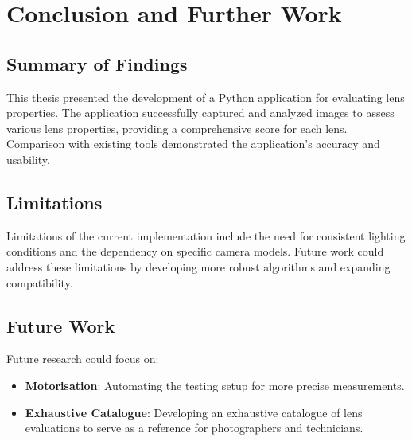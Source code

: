 \chapter{Conclusion and Further Work}
\section{Summary of Findings}
This thesis presented the development of a Python application for evaluating lens properties. The application successfully captured and analyzed images to assess various lens properties, providing a comprehensive score for each lens. Comparison with existing tools demonstrated the application's accuracy and usability.

\section{Limitations}
Limitations of the current implementation include the need for consistent lighting conditions and the dependency on specific camera models. Future work could address these limitations by developing more robust algorithms and expanding compatibility.

\section{Future Work}
Future research could focus on:
\begin{itemize}
    \item \textbf{Motorisation}: Automating the testing setup for more precise measurements.
    \item \textbf{Exhaustive Catalogue}: Developing an exhaustive catalogue of lens evaluations to serve as a reference for photographers and technicians.
\end{itemize}
